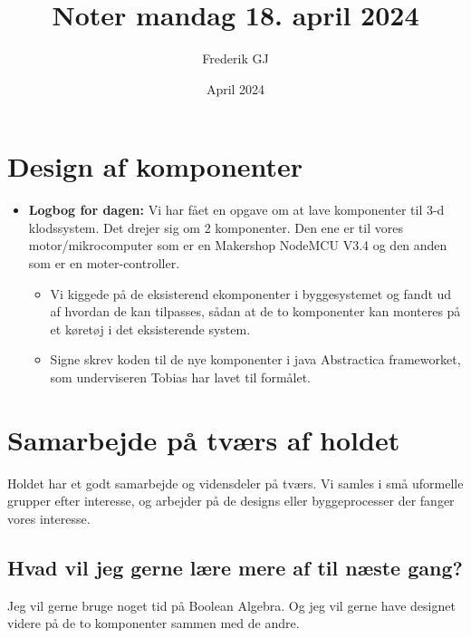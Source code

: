 \documentclass{article}
\title{Noter mandag 18. april 2024}
\author{Frederik GJ}
\date{April 2024}
\begin{document}
\maketitle

\section{Design af komponenter}

\begin{itemize}
    \item \textbf{Logbog for dagen:} Vi har fået en opgave om at lave komponenter til 3-d klodssystem. Det drejer sig om 2 komponenter. Den ene er til vores motor/mikrocomputer som er en Makershop NodeMCU V3.4 og den anden som er en moter-controller. 
    \begin{itemize}
        \item Vi kiggede på de eksisterend ekomponenter i byggesystemet og fandt ud af hvordan de kan tilpasses, sådan at de to komponenter kan monteres på et køretøj i det eksisterende system.
        \item Signe skrev koden til de nye komponenter i java Abstractica frameworket, som underviseren Tobias har lavet til formålet.
    \end{itemize}
\end{itemize}

\section{Samarbejde på tværs af holdet}
Holdet har et godt samarbejde og vidensdeler på tværs. 
Vi samles i små uformelle grupper efter interesse, og arbejder på de designs eller byggeprocesser der fanger vores interesse. 
\subsection{Hvad vil jeg gerne lære mere af til næste gang?}
Jeg vil gerne bruge noget tid på Boolean Algebra. Og jeg vil gerne have designet videre på de to komponenter sammen med de andre. 
\end{document}
